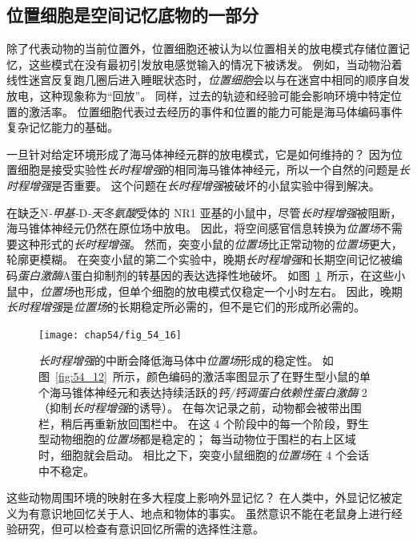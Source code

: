 \subsection{位置细胞是空间记忆底物的一部分}

除了代表动物的当前位置外，位置细胞还被认为以位置相关的放电模式存储位置记忆，这些模式在没有最初引发放电感觉输入的情况下被诱发。
例如，当动物沿着线性迷宫反复跑几圈后进入睡眠状态时，\textit{位置细胞}会以与在迷宫中相同的顺序自发放电，这种现象称为“回放”。
同样，过去的轨迹和经验可能会影响环境中特定位置的激活率。
位置细胞代表过去经历的事件和位置的能力可能是海马体编码事件复杂记忆能力的基础。


一旦针对给定环境形成了海马体神经元群的放电模式，它是如何维持的？
因为位置细胞是接受实验性\textit{长时程增强}的相同海马锥体神经元，所以一个自然的问题是\textit{长时程增强}是否重要。
这个问题在\textit{长时程增强}被破坏的小鼠实验中得到解决。


在缺乏N\textit{-甲基-}D\textit{-天冬氨酸}受体的 NR1 亚基的小鼠中，尽管\textit{长时程增强}被阻断，海马锥体神经元仍然在原位场中放电。
因此，将空间感官信息转换为\textit{位置场}不需要这种形式的\textit{长时程增强}。
然而，突变小鼠的\textit{位置场}比正常动物的\textit{位置场}更大，轮廓更模糊。
在突变小鼠的第二个实验中，晚期\textit{长时程增强}和长期空间记忆被编码\textit{蛋白激酶}A蛋白抑制剂的转基因的表达选择性地破坏。
如图~\ref{fig:54_16}~所示，在这些小鼠中，\textit{位置场}也形成，但单个细胞的放电模式仅稳定一个小时左右。
因此，晚期\textit{长时程增强}是\textit{位置场}的长期稳定所必需的，但不是它们的形成所必需的。


\begin{figure}[htbp]
	\centering
	\texttt{[image: chap54/fig\_54\_16]}
	\caption{\textit{长时程增强}的中断会降低海马体中\textit{位置场}形成的稳定性。
		如图~\ref{fig:54_12}~所示，颜色编码的激活率图显示了在野生型小鼠的单个海马锥体神经元和表达持续活跃的\textit{钙/钙调蛋白依赖性蛋白激酶} 2（抑制\textit{长时程增强}的诱导）。
		在每次记录之前，动物都会被带出围栏，稍后再重新放回围栏中。
		在这 4 个阶段中的每一个阶段，野生型动物细胞的\textit{位置场}都是稳定的；
		每当动物位于围栏的右上区域时，细胞就会启动。
		相比之下，突变小鼠细胞的\textit{位置场}在 4 个会话中不稳定\cite{rotenberg1996mice}。}
	\label{fig:54_16}
\end{figure}


这些动物周围环境的映射在多大程度上影响外显记忆？
在人类中，外显记忆被定义为有意识地回忆关于人、地点和物体的事实。
虽然意识不能在老鼠身上进行经验研究，但可以检查有意识回忆所需的选择性注意。


